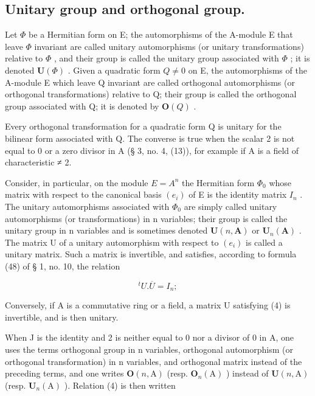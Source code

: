 \subsection{Unitary group and orthogonal group.}

Let \(\Phi\) be a Hermitian form on E; the automorphisms of the A-module E that leave \(\Phi\) invariant are called unitary automorphisms (or unitary transformations) relative to \(\Phi\) , and their group is called the unitary group associated with \(\Phi\) ; it is denoted \(\mathbf{U}(\Phi)\) . Given a quadratic form \(Q \neq 0\) on E, the automorphisms of the A-module E which leave Q invariant are called orthogonal automorphisms (or orthogonal transformations) relative to Q; their group is called the orthogonal group associated with Q; it is denoted by \(\mathbf{O}(Q)\) .

Every orthogonal transformation for a quadratic form Q is unitary for the bilinear form associated with Q. The converse is true when the scalar 2 is not equal to 0 or a zero divisor in A (§ 3, no. 4, (13)), for example if A is a field of characteristic ≠ 2.

Consider, in particular, on the module \(E = A^{n}\) the Hermitian form \(\Phi_{0}\) whose matrix with respect to the canonical basis \((e_{i})\) of E is the identity matrix \(I_{n}\) . The unitary automorphisms associated with \(\Phi_{0}\) are simply called unitary automorphisms (or transformations) in n variables; their group is called the unitary group in n variables and is sometimes denoted \(\mathbf{U}(n, \mathbf{A})\) or \(\mathbf{U}_{n}(\mathbf{A})\) . The matrix U of a unitary automorphism with respect to \((e_{i})\) is called a unitary matrix. Such a matrix is invertible, and satisfies, according to formula (48) of § 1, no. 10, the relation

\[
{ } ^ { t } U . \overline { { U } } = I _ { n } ;\tag{4}
\]

Conversely, if A is a commutative ring or a field, a matrix U satisfying (4) is invertible, and is then unitary.

When J is the identity and 2 is neither equal to 0 nor a divisor of 0 in A, one uses the terms orthogonal group in n variables, orthogonal automorphism (or orthogonal transformation) in n variables, and orthogonal matrix instead of the preceding terms, and one writes \(\mathbf{O}(n,\mathrm{A})\) (resp. \(\mathbf{O}_n(\mathrm{A})\) ) instead of \(\mathbf{U}(n,\mathrm{A})\) (resp. \(\mathbf{U}_n(\mathrm{A})\) ). Relation (4) is then written

